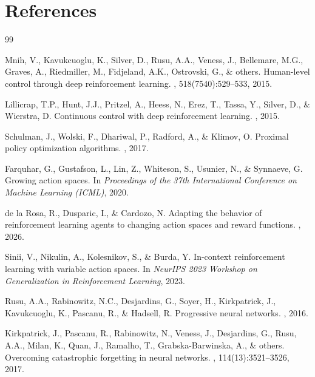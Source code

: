 \documentclass{article}
\begin{document}


\section*{References}
{\small
\begin{thebibliography}{99}

Mnih, V., Kavukcuoglu, K., Silver, D., Rusu, A.A., Veness, J., Bellemare, M.G., Graves, A., Riedmiller, M., Fidjeland, A.K., Ostrovski, G., \& others.
\newblock Human-level control through deep reinforcement learning.
, 518(7540):529--533, 2015.

Lillicrap, T.P., Hunt, J.J., Pritzel, A., Heess, N., Erez, T., Tassa, Y., Silver, D., \& Wierstra, D.
\newblock Continuous control with deep reinforcement learning.
, 2015.

Schulman, J., Wolski, F., Dhariwal, P., Radford, A., \& Klimov, O.
\newblock Proximal policy optimization algorithms.
, 2017.

Farquhar, G., Gustafson, L., Lin, Z., Whiteson, S., Usunier, N., \& Synnaeve, G.
\newblock Growing action spaces.
\newblock In {\it Proceedings of the 37th International Conference on Machine Learning (ICML)}, 2020.

de la Rosa, R., Dusparic, I., \& Cardozo, N.
\newblock Adapting the behavior of reinforcement learning agents to changing
  action spaces and reward functions.
, 2026.

Sinii, V., Nikulin, A., Kolesnikov, S., \& Burda, Y.
\newblock In-context reinforcement learning with variable action spaces.
\newblock In {\it NeurIPS 2023 Workshop on Generalization in Reinforcement Learning}, 2023.

Rusu, A.A., Rabinowitz, N.C., Desjardins, G., Soyer, H., Kirkpatrick, J., Kavukcuoglu, K., Pascanu, R., \& Hadsell, R.
\newblock Progressive neural networks.
, 2016.

Kirkpatrick, J., Pascanu, R., Rabinowitz, N., Veness, J., Desjardins, G., Rusu, A.A., Milan, K., Quan, J., Ramalho, T., Grabska-Barwinska, A., \& others.
\newblock Overcoming catastrophic forgetting in neural networks.
, 114(13):3521--3526, 2017.


\end{thebibliography}}
\end{document}
